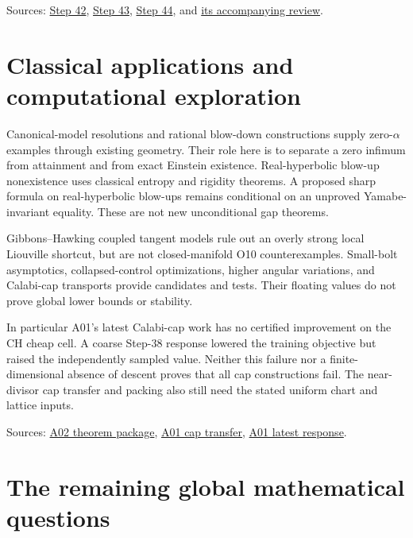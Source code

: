 \documentclass[
]{article}
\begin{document}
Sources:
\href{sources/Sessions/S1003A02/workspace/notes/step42_ak_torsion_profile_taubes_goldberg.md}{Step
42},
\href{sources/Sessions/S1003A02/workspace/notes/step43_w0_cotton_quadratic_law_and_debts.md}{Step
43},
\href{sources/Sessions/S1003A02/workspace/notes/step44_perturbative_ke_coercivity_and_pocket_price.md}{Step
44}, and
\href{sources/Sessions/S1003A02/trace/ttcs/results/step44_ttcs01_sub1_verifier.md}{its
accompanying review}.

\hypertarget{classical-applications-and-computational-exploration}{%
\section{Classical applications and computational
exploration}\label{classical-applications-and-computational-exploration}}

Canonical-model resolutions and rational blow-down constructions supply
zero-\(\alpha\) examples through existing geometry. Their role here is
to separate a zero infimum from attainment and from exact Einstein
existence. Real-hyperbolic blow-up nonexistence uses classical entropy
and rigidity theorems. A proposed sharp formula on real-hyperbolic
blow-ups remains conditional on an unproved Yamabe-invariant equality.
These are not new unconditional gap theorems.

Gibbons--Hawking coupled tangent models rule out an overly strong local
Liouville shortcut, but are not closed-manifold O10 counterexamples.
Small-bolt asymptotics, collapsed-control optimizations, higher angular
variations, and Calabi-cap transports provide candidates and tests.
Their floating values do not prove global lower bounds or stability.

In particular A01's latest Calabi-cap work has no certified improvement
on the CH cheap cell. A coarse Step-38 response lowered the training
objective but raised the independently sampled value. Neither this
failure nor a finite-dimensional absence of descent proves that all cap
constructions fail. The near-divisor cap transfer and packing also still
need the stated uniform chart and lattice inputs.

Sources:
\href{sources/Sessions/S1003A02/workspace/notes/theorem_package_v1.md}{A02
theorem package},
\href{sources/Sessions/S1003A01/workspace/notes/step35_cap_transfer_neutrality_and_cap_cells.md}{A01
cap transfer},
\href{sources/Sessions/S1003A01/workspace/notes/step38_curvature_conditioned_cap_response.md}{A01
latest response}.

\hypertarget{the-remaining-global-mathematical-questions}{%
\section{The remaining global mathematical
questions}\label{the-remaining-global-mathematical-questions}}
\end{document}
